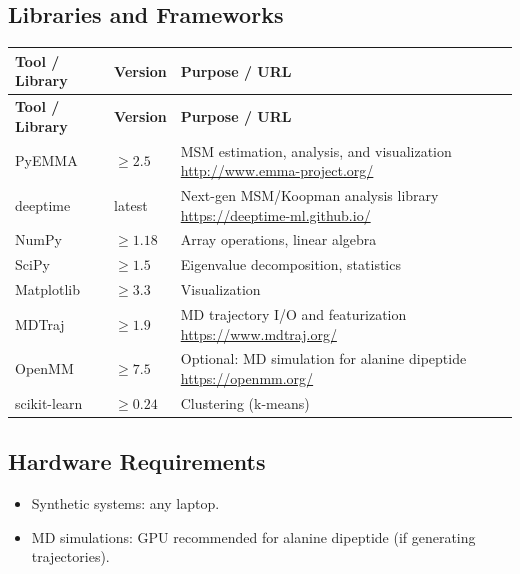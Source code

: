 \documentclass[11pt,a4paper]{article}
\begin{document}
\subsection{Libraries and Frameworks}
\begin{longtable}{p{4.5cm} p{2.5cm} p{6.5cm}}
\toprule
\textbf{Tool / Library} & \textbf{Version} & \textbf{Purpose / URL} \\
\midrule
\endfirsthead
\toprule
\textbf{Tool / Library} & \textbf{Version} & \textbf{Purpose / URL} \\
\midrule
\endhead
PyEMMA & $\geq 2.5$ & MSM estimation, analysis, and visualization \newline \url{http://www.emma-project.org/} \\
\midrule
deeptime & latest & Next-gen MSM/Koopman analysis library \newline \url{https://deeptime-ml.github.io/} \\
\midrule
NumPy & $\geq 1.18$ & Array operations, linear algebra \\
\midrule
SciPy & $\geq 1.5$ & Eigenvalue decomposition, statistics \\
\midrule
Matplotlib & $\geq 3.3$ & Visualization \\
\midrule
MDTraj & $\geq 1.9$ & MD trajectory I/O and featurization \newline \url{https://www.mdtraj.org/} \\
\midrule
OpenMM & $\geq 7.5$ & Optional: MD simulation for alanine dipeptide \newline \url{https://openmm.org/} \\
\midrule
scikit-learn & $\geq 0.24$ & Clustering (k-means) \\
\bottomrule
\end{longtable}

\subsection{Hardware Requirements}
\begin{itemize}
  \item Synthetic systems: any laptop.
  \item MD simulations: GPU recommended for alanine dipeptide (if generating trajectories).
\end{itemize}
\end{document}
